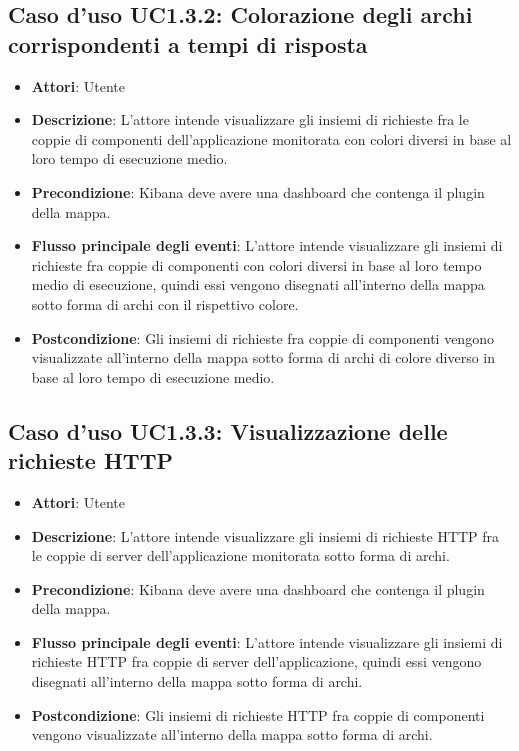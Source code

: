 \subsection{Caso d'uso UC1.3.2: Colorazione degli archi corrispondenti a tempi di risposta}
\begin{itemize}
	\item \textbf{Attori}: Utente
	\item \textbf{Descrizione}: L'attore intende visualizzare gli insiemi di richieste fra le coppie di componenti dell'applicazione monitorata con colori diversi in base al loro tempo di esecuzione medio.
	\item \textbf{Precondizione}: Kibana deve avere una dashboard che contenga il plugin della mappa.
	
	\item \textbf{Flusso principale degli eventi}: L'attore intende visualizzare gli insiemi di richieste fra coppie di componenti con colori diversi in base al loro tempo medio di esecuzione, quindi essi vengono disegnati all'interno della mappa sotto forma di archi con il rispettivo colore.
	\item \textbf{Postcondizione}: Gli insiemi di richieste fra coppie di componenti vengono visualizzate all'interno della mappa sotto forma di archi di colore diverso in base al loro tempo di esecuzione medio.
\end{itemize}
\subsection{Caso d'uso UC1.3.3: Visualizzazione delle richieste HTTP}
\begin{itemize}
	\item \textbf{Attori}: Utente
	\item \textbf{Descrizione}: L'attore intende visualizzare gli insiemi di richieste HTTP fra le coppie di server dell'applicazione monitorata sotto forma di archi.
	\item \textbf{Precondizione}: Kibana deve avere una dashboard che contenga il plugin della mappa.
	\item \textbf{Flusso principale degli eventi}: L'attore intende visualizzare gli insiemi di richieste HTTP fra coppie di server dell'applicazione, quindi essi vengono disegnati all'interno della mappa sotto forma di archi.
	\item \textbf{Postcondizione}: Gli insiemi di richieste HTTP fra coppie di componenti vengono visualizzate all'interno della mappa sotto forma di archi.
\end{itemize}
